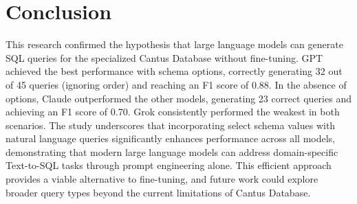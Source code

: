\section{Conclusion}

This research confirmed the hypothesis that large language models can generate SQL queries for the specialized Cantus Database without fine-tuning. GPT achieved the best performance with schema options, correctly generating 32 out of 45 queries (ignoring order) and reaching an F1 score of 0.88. In the absence of options, Claude outperformed the other models, generating 23 correct queries and achieving an F1 score of 0.70. Grok consistently performed the weakest in both scenarios. The study underscores that incorporating select schema values with natural language queries significantly enhances performance across all models, demonstrating that modern large language models can address domain-specific Text-to-SQL tasks through prompt engineering alone. This efficient approach provides a viable alternative to fine-tuning, and future work could explore broader query types beyond the current limitations of Cantus Database.
